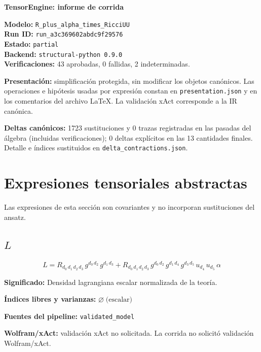 \documentclass[11pt]{article}
\begin{document}
\begin{center}
{\Large\bfseries TensorEngine: informe de corrida}
\end{center}
\textbf{Modelo:} \texttt{R\_plus\_alpha\_times\_RicciUU}\\
\textbf{Run ID:} \texttt{run\_a3c369602abdc9f29576}\\
\textbf{Estado:} \texttt{partial}\\
\textbf{Backend:} \texttt{structural-python 0.9.0}\\
\textbf{Verificaciones:} 43 aprobadas, 0 fallidas, 2 indeterminadas.
\par\smallskip
\textbf{Presentación:} simplificación protegida, sin modificar los objetos canónicos. Las operaciones e hipótesis usadas por expresión constan en \texttt{presentation.json} y en los comentarios del archivo LaTeX. La validación xAct corresponde a la IR canónica.\par
\textbf{Deltas canónicos:} 1723 sustituciones y 0 trazas registradas en las pasadas del álgebra (incluidas verificaciones); 0 deltas explícitos en las 13 cantidades finales. Detalle e índices sustituidos en \texttt{delta\_contractions.json}.\par
\section*{Expresiones tensoriales abstractas}
Las expresiones de esta sección son covariantes y no incorporan sustituciones del ansatz.
\subsection*{$ L $}
\begin{dmath*}[breakdepth={5}]
L = R{}_{d_{0}\,d_{1}\,d_{2}\,d_{3}}\,g{}^{d_{0}\,d_{2}}\,g{}^{d_{1}\,d_{3}} + R{}_{d_{0}\,d_{1}\,d_{2}\,d_{3}}\,g{}^{d_{0}\,d_{2}}\,g{}^{d_{1}\,d_{4}}\,g{}^{d_{3}\,d_{5}}\,u{}_{d_{4}}\,u{}_{d_{5}}\,\alpha
\end{dmath*}
\par\vspace{1.2\baselineskip}\noindent
\begin{minipage}{\linewidth}
\textbf{Significado:} Densidad lagrangiana escalar normalizada de la teoría.\par
\textbf{Índices libres y varianzas:} $ \varnothing\;\text{(escalar)} $\par
\textbf{Fuentes del pipeline:} \texttt{validated\_model}\par
\textbf{Wolfram/xAct:} validación xAct no solicitada. La corrida no solicitó validación Wolfram/xAct.\par
\end{minipage}
\end{document}
